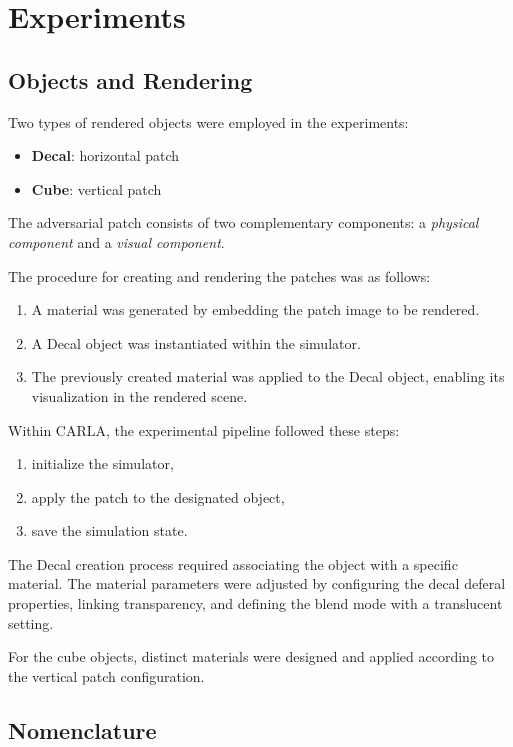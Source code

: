 \chapter{Experiments}
\label{experiments}

\section{Objects and Rendering}

Two types of rendered objects were employed in the experiments:
\begin{itemize}
    \item \textbf{Decal}: horizontal patch
    \item \textbf{Cube}: vertical patch
\end{itemize}

The adversarial patch consists of two complementary components: a \textit{physical component} and a \textit{visual component}.

The procedure for creating and rendering the patches was as follows:
\begin{enumerate}
    \item A material was generated by embedding the patch image to be rendered.
    \item A Decal object was instantiated within the simulator.
    \item The previously created material was applied to the Decal object, enabling its visualization in the rendered scene.
\end{enumerate}

Within CARLA, the experimental pipeline followed these steps:
\begin{enumerate}
    \item initialize the simulator,
    \item apply the patch to the designated object,
    \item save the simulation state.
\end{enumerate}

The Decal creation process required associating the object with a specific material. 
The material parameters were adjusted by configuring the decal deferal properties, linking transparency, and defining the blend mode with a translucent setting.

For the cube objects, distinct materials were designed and applied according to the vertical patch configuration.

\section{Nomenclature}

